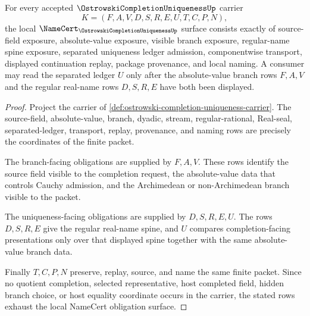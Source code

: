 \begin{theorem}
\label{thm:ostrowski-completion-uniqueness-namecert-obligations}
For every accepted $\OstrowskiCompletionUniquenessUp$ carrier
$$
K=(F,A,V,D,S,R,E,U,T,C,P,N),
$$
the local $\NameCert_{\OstrowskiCompletionUniquenessUp}$ surface consists exactly of source-field exposure, absolute-value exposure, visible branch exposure, regular-name spine exposure, separated uniqueness ledger admission, componentwise transport, displayed continuation replay, package provenance, and local naming. A consumer may read the separated ledger $U$ only after the absolute-value branch rows $F,A,V$ and the regular real-name rows $D,S,R,E$ have both been displayed.
\end{theorem}
\begin{proof}
Project the carrier of \autoref{def:ostrowski-completion-uniqueness-carrier}. The source-field, absolute-value, branch, dyadic, stream, regular-rational, Real-seal, separated-ledger, transport, replay, provenance, and naming rows are precisely the coordinates of the finite packet.

The branch-facing obligations are supplied by $F,A,V$. These rows identify the source field visible to the completion request, the absolute-value data that controls Cauchy admission, and the Archimedean or non-Archimedean branch visible to the packet.

The uniqueness-facing obligations are supplied by $D,S,R,E,U$. The rows $D,S,R,E$ give the regular real-name spine, and $U$ compares completion-facing presentations only over that displayed spine together with the same absolute-value branch data.

Finally $T,C,P,N$ preserve, replay, source, and name the same finite packet. Since no quotient completion, selected representative, host completed field, hidden branch choice, or host equality coordinate occurs in the carrier, the stated rows exhaust the local NameCert obligation surface.
\end{proof}

